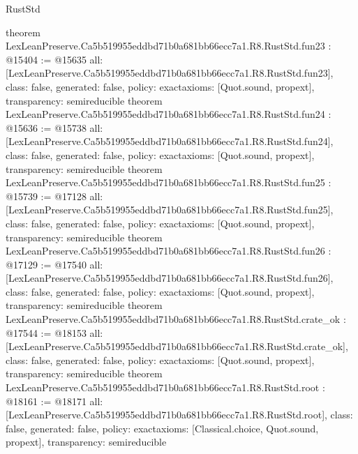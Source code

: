 \begin{lexlean}{RustStd}
\begin{coremodule}
{}
theorem LexLeanPreserve.Ca5b519955eddbd71b0a681bb66ecc7a1.R8.RustStd.fun23 : @15404 := @15635 {
  all: [LexLeanPreserve.Ca5b519955eddbd71b0a681bb66ecc7a1.R8.RustStd.fun23],
  class: false,
  generated: false,
  policy: exact{axioms: [Quot.sound, propext]},
  transparency: semireducible
}
theorem LexLeanPreserve.Ca5b519955eddbd71b0a681bb66ecc7a1.R8.RustStd.fun24 : @15636 := @15738 {
  all: [LexLeanPreserve.Ca5b519955eddbd71b0a681bb66ecc7a1.R8.RustStd.fun24],
  class: false,
  generated: false,
  policy: exact{axioms: [Quot.sound, propext]},
  transparency: semireducible
}
theorem LexLeanPreserve.Ca5b519955eddbd71b0a681bb66ecc7a1.R8.RustStd.fun25 : @15739 := @17128 {
  all: [LexLeanPreserve.Ca5b519955eddbd71b0a681bb66ecc7a1.R8.RustStd.fun25],
  class: false,
  generated: false,
  policy: exact{axioms: [Quot.sound, propext]},
  transparency: semireducible
}
theorem LexLeanPreserve.Ca5b519955eddbd71b0a681bb66ecc7a1.R8.RustStd.fun26 : @17129 := @17540 {
  all: [LexLeanPreserve.Ca5b519955eddbd71b0a681bb66ecc7a1.R8.RustStd.fun26],
  class: false,
  generated: false,
  policy: exact{axioms: [Quot.sound, propext]},
  transparency: semireducible
}
theorem LexLeanPreserve.Ca5b519955eddbd71b0a681bb66ecc7a1.R8.RustStd.crate_ok : @17544 := @18153 {
  all: [LexLeanPreserve.Ca5b519955eddbd71b0a681bb66ecc7a1.R8.RustStd.crate_ok],
  class: false,
  generated: false,
  policy: exact{axioms: [Quot.sound, propext]},
  transparency: semireducible
}
theorem LexLeanPreserve.Ca5b519955eddbd71b0a681bb66ecc7a1.R8.RustStd.root : @18161 := @18171 {
  all: [LexLeanPreserve.Ca5b519955eddbd71b0a681bb66ecc7a1.R8.RustStd.root],
  class: false,
  generated: false,
  policy: exact{axioms: [Classical.choice, Quot.sound, propext]},
  transparency: semireducible
}


\end{coremodule}
\end{lexlean}
